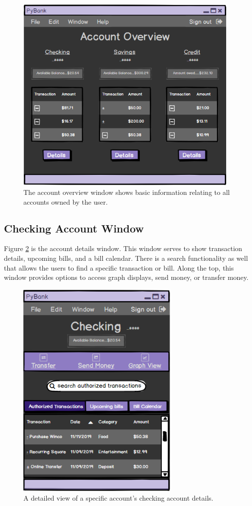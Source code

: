 \FloatBarrier
\begin{figure}[!ht]
    \centering
    \includegraphics[width=11cm]{figures/accountoverview.png}
    \caption{The account overview window shows basic information relating to all accounts owned by the user.}
    \label{fig:overview}
\end{figure}

\newpage

\subsection{Checking Account Window}
\label{sect:checking_acct}

Figure \ref{fig:details} is the account details window. This window serves to show transaction details, upcoming bills, and a bill calendar. There is a search functionality as well that allows the users to find a specific transaction or bill. Along the top, this window provides options to access graph displays, send money, or transfer money.

\FloatBarrier
\begin{figure}[!ht]
    \centering
    \includegraphics[width=8cm]{figures/accountdetails.png}
    \caption{A detailed view of a specific account's checking account details.}
    \label{fig:details}
\end{figure}

